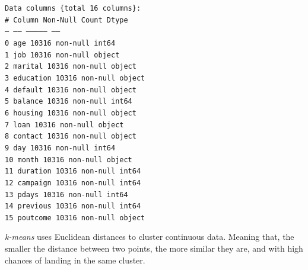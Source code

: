 \documentclass[12pt]{article}
\begin{document}
\begin{enumerate}[leftmargin=0pt, label=\textbf{\arabic*.)},start=1]
\begin{enumerate}[leftmargin=0pt, label=\textbf{\alph*.)}]
                    \begin{center}
                        \begin{minipage}{0.5\textwidth}
                            \texttt{Data columns \{total 16 columns\}:\\
                                \#   Column     Non-Null Count  Dtype \\
                                ---  ------     --------------  ----- \\
                                0   age        10316 non-null  int64 \\
                                1   job        10316 non-null  object \\
                                2   marital    10316 non-null  object \\
                                3   education  10316 non-null  object \\
                                4   default    10316 non-null  object \\
                                5   balance    10316 non-null  int64 \\
                                6   housing    10316 non-null  object \\
                                7   loan       10316 non-null  object \\
                                8   contact    10316 non-null  object \\
                                9   day        10316 non-null  int64 \\
                                10  month      10316 non-null  object \\
                                11  duration   10316 non-null  int64 \\
                                12  campaign   10316 non-null  int64 \\
                                13  pdays      10316 non-null  int64 \\
                                14  previous   10316 non-null  int64 \\
                                15  poutcome   10316 non-null  object\\}
                        \end{minipage}
                    \end{center}

                    \textit{k-means} uses Euclidean distances to cluster continuous data. Meaning that, the smaller the distance between two points, the more similar they are, and with high chances of landing in the same cluster.


\end{enumerate}
\end{enumerate}
\end{document}

